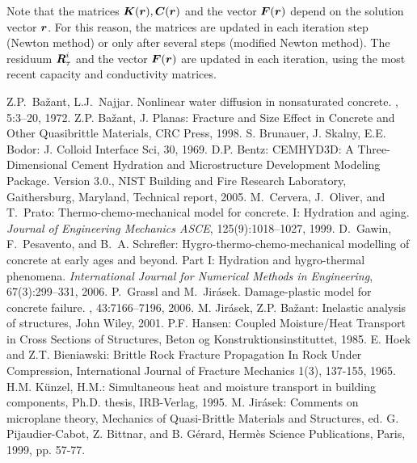 \documentclass[a4paper]{article}
\newcommand{\mbf}[1]{\mbox{\boldmath$#1$}}
\begin{document}
Note that the matrices $\mbf{K}(\mbf{r}), \mbf{C}(\mbf{r})$ and the vector $\mbf{F}(\mbf{r})$ depend on the solution vector $\mbf{r}$. For this reason, the matrices are updated in each iteration step (Newton method) or only after several steps (modified Newton method). The residuum $\mbf{R}_\tau^{i}$ and the vector $\mbf{F}(\mbf{r})$ are updated in each iteration, using the most recent capacity and conductivity matrices.

\begin{thebibliography}{99}
 Z.P.~Ba\v{z}ant, L.J.~Najjar.
\newblock  Nonlinear water diffusion in nonsaturated concrete.
, 5:3--20, 1972.
 Z.P. Ba\v{z}ant, J. Planas: Fracture and Size
  Effect in Concrete and Other Quasibrittle  Materials, CRC Press,
  1998.
 S. Brunauer, J. Skalny, E.E. Bodor: J. Colloid Interface
  Sci, 30, 1969.
 D.P. Bentz: CEMHYD3D: A Three-Dimensional Cement Hydration and Microstructure Development Modeling Package. Version 3.0., NIST Building and Fire Research Laboratory, Gaithersburg, Maryland, Technical report, 2005.
 M.~Cervera, J.~Oliver, and T.~Prato: Thermo-chemo-mechanical model for concrete. I: Hydration and aging. {\em Journal of Engineering Mechanics ASCE}, 125(9):1018--1027, 1999.
 D.~Gawin, F.~Pesavento, and B.~A. Schrefler: Hygro-thermo-chemo-mechanical modelling of concrete at early ages and beyond. Part I: Hydration and hygro-thermal phenomena. {\em International Journal for Numerical Methods in Engineering}, 67(3):299--331, 2006.
 P.~Grassl and M.~Jir\'{a}sek.
\newblock Damage-plastic model for concrete failure.
, 43:7166--7196, 2006.
 M. Jir\'asek, Z.P. Ba\v zant: Inelastic analysis of
  structures, John Wiley, 2001.
 P.F. Hansen: Coupled Moisture/Heat Transport in
  Cross Sections of Structures, Beton og Konstruktionsinstituttet, 1985.
 E. Hoek and Z.T. Bieniawski: Brittle Rock Fracture Propagation
In Rock Under Compression, International Journal of Fracture Mechanics
1(3), 137-155, 1965.
 H.M. K{\"u}nzel, H.M.: Simultaneous heat and
  moisture transport in building components, Ph.D. thesis, IRB-Verlag,
  1995.
 M. Jir\'{a}sek: Comments on microplane theory, Mechanics of Quasi-Brittle Materials and Structures, ed. G. Pijaudier-Cabot, Z. Bittnar, and B. G\'{e}rard, Herm\`{e}s Science Publications, Paris, 1999, pp. 57-77.

\end{thebibliography}
\end{document}
